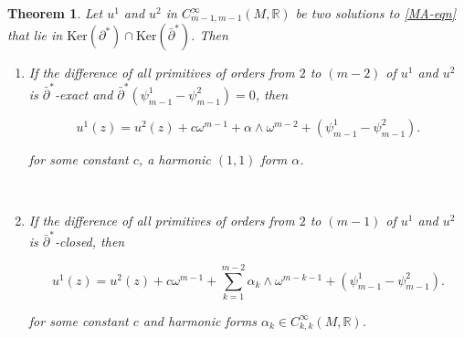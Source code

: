 \documentclass[10pt,a4paper]{amsart}
\newcommand{\sbpartial}{\bar{\partial}^*}
\newcommand{\spartial}{\partial^*}
\newcommand{\Ker}{\mbox{Ker}}
\newtheorem{theorem}{Theorem}[section]
\numberwithin{equation}{section}
\begin{document}
\begin{theorem}\label{unique-thm}
Let $u^1$ and $u^2$ in $C_{m-1,m-1}^{\infty}(M, \mathbb R)$ be two solutions to \eqref{MA-eqn} that lie in $\Ker (\spartial) \cap \Ker( \bar{\partial}^*)$. Then

\begin{enumerate}
    \item If the difference of all primitives of orders from $2$ to $(m-2)$ of $u^1$ and $u^2$ is $\bar\partial^*$-exact and $\sbpartial(\psi^1_{m-1} - \psi_{m-1}^2) =0 $, then

$$u^1(z) = u^2(z) + c \omega^{m-1} + \alpha \wedge \omega^{m-2} +  (\psi^1_{m-1} - \psi_{m-1}^2).$$

\noindent for some constant $c$, a harmonic $(1,1)$ form $\alpha$.

\

\item If the difference of all primitives of orders from $2$ to $(m-1)$ of $u^1$ and $u^2$ is $\bar\partial^*$-closed, then

$$u^1(z) = u^2(z) + c \omega^{m-1} + \sum_{k=1}^{m-2} \alpha_k \wedge \omega^{m-k-1} + (\psi^1_{m-1} - \psi_{m-1}^2).$$

\noindent for some constant $c$ and harmonic forms $\alpha_k \in C^{\infty}_{k,k}(M, \mathbb R) $.
\end{enumerate}


\end{theorem}

\
\end{document}
